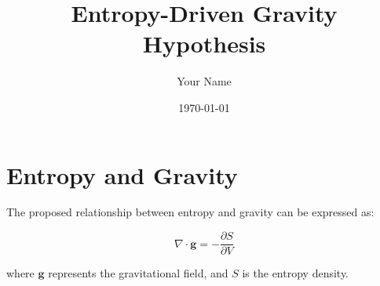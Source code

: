 \documentclass{article}
\begin{document}
    \title{Entropy-Driven Gravity Hypothesis}
    \author{Your Name}
    \date{\today}
    \maketitle

    \section{Entropy and Gravity}
    The proposed relationship between entropy and gravity can be expressed as:

    \begin{equation}
        \nabla \cdot \mathbf{g} = -\frac{\partial S}{\partial V}
    \end{equation}

    where \( \mathbf{g} \) represents the gravitational field, and \( S \) is the entropy density.

    
\end{document}
